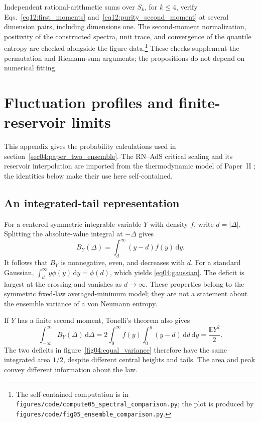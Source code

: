 \documentclass[11pt,letterpaper]{article}
\theoremstyle{plain}
\theoremstyle{definition}
\theoremstyle{remark}
\newcommand{\E}{\mathbb{E}}
\begin{document}
Independent rational-arithmetic sums over $S_k$, for $k\leq4$,
verify Eqs.~\eqref{eq12:first_moments}
and~\eqref{eq12:purity_second_moment} at several dimension pairs,
including dimensions one.  The second-moment normalization, positivity
of the constructed spectra, unit trace, and convergence of the
quantile entropy are checked alongside the figure data.\footnote{The
self-contained computation is in
\nolinkurl{figures/code/compute05_spectral_comparison.py}; the plot is
produced by \nolinkurl{figures/code/fig05_ensemble_comparison.py}.}
These checks supplement the permutation and Riemann-sum arguments;
the propositions do not depend on numerical fitting.

\section{Fluctuation profiles and finite-reservoir limits}
\label{sec13:appendix_paper_two}

This appendix gives the probability calculations used in
section~\ref{sec04:paper_two_ensemble}. The RN--AdS critical scaling and
its reservoir interpolation are imported from the thermodynamic model
of Paper~II \cite{wuebben2026b}; the identities below make their use here
self-contained.

\subsection{An integrated-tail representation}

For a centered symmetric integrable variable $Y$ with density $f$, write
$d=|\Delta|$. Splitting the absolute-value integral at $-\Delta$ gives
\begin{equation}
 B_Y(\Delta)=\int_d^\infty(y-d)f(y)\,\mathrm dy.
 \label{eq13:tail}
\end{equation}
It follows that $B_Y$ is nonnegative, even, and decreases with $d$.
For a standard Gaussian, $\int_d^\infty y\phi(y)\,\mathrm dy=\phi(d)$,
which yields \eqref{eq04:gaussian}. The deficit is largest at the
crossing and vanishes as $d\to\infty$. These properties belong to the
symmetric fixed-law averaged-minimum model; they are not a statement
about the ensemble variance of a von Neumann entropy.

If $Y$ has a finite second moment, Tonelli's theorem also gives
\begin{equation}
 \int_{-\infty}^{\infty} B_Y(\Delta)\,\mathrm d\Delta
 =2\int_0^\infty\!f(y)\int_0^y(y-d)\,\mathrm dd\,\mathrm dy
 =\frac{\E Y^2}{2}.
 \label{eq13:area}
\end{equation}
The two deficits in figure~\ref{fig04:equal_variance} therefore have the
same integrated area $1/2$, despite different central heights and
tails. The area and peak convey different information about the law.
\end{document}
